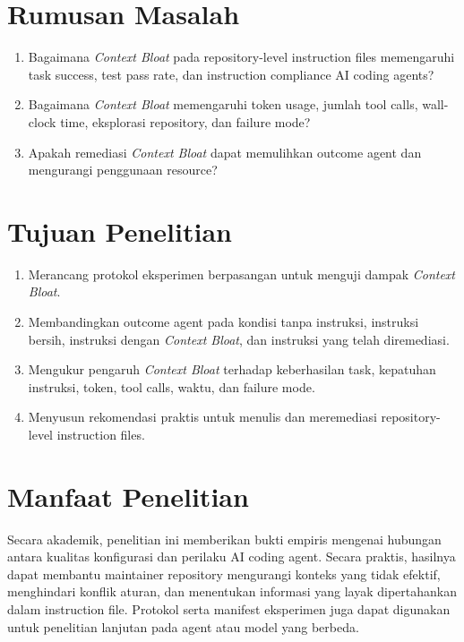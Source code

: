 \section{Rumusan Masalah}

\begin{enumerate}[leftmargin=*]
    \item Bagaimana \textit{Context Bloat} pada repository-level instruction files memengaruhi task success, test pass rate, dan instruction compliance AI coding agents?
    \item Bagaimana \textit{Context Bloat} memengaruhi token usage, jumlah tool calls, wall-clock time, eksplorasi repository, dan failure mode?
    \item Apakah remediasi \textit{Context Bloat} dapat memulihkan outcome agent dan mengurangi penggunaan resource?
\end{enumerate}

\section{Tujuan Penelitian}

\begin{enumerate}[leftmargin=*]
    \item Merancang protokol eksperimen berpasangan untuk menguji dampak \textit{Context Bloat}.
    \item Membandingkan outcome agent pada kondisi tanpa instruksi, instruksi bersih, instruksi dengan \textit{Context Bloat}, dan instruksi yang telah diremediasi.
    \item Mengukur pengaruh \textit{Context Bloat} terhadap keberhasilan task, kepatuhan instruksi, token, tool calls, waktu, dan failure mode.
    \item Menyusun rekomendasi praktis untuk menulis dan meremediasi repository-level instruction files.
\end{enumerate}

\section{Manfaat Penelitian}

Secara akademik, penelitian ini memberikan bukti empiris mengenai hubungan antara kualitas konfigurasi dan perilaku AI coding agent. Secara praktis, hasilnya dapat membantu maintainer repository mengurangi konteks yang tidak efektif, menghindari konflik aturan, dan menentukan informasi yang layak dipertahankan dalam instruction file. Protokol serta manifest eksperimen juga dapat digunakan untuk penelitian lanjutan pada agent atau model yang berbeda.

